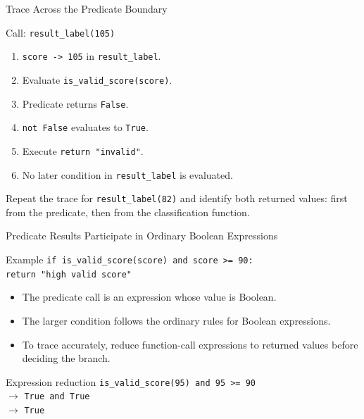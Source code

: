 \documentclass[aspectratio=169,10pt]{beamer}
\begin{document}
\begin{frame}{Trace Across the Predicate Boundary}
  \begin{block}{Call: \texttt{result\_label(105)}}
    \begin{enumerate}
      \item \texttt{score -> 105} in \texttt{result\_label}.
      \item Evaluate \texttt{is\_valid\_score(score)}.
      \item Predicate returns \texttt{False}.
      \item \texttt{not False} evaluates to \texttt{True}.
      \item Execute \texttt{return "invalid"}.
      \item No later condition in \texttt{result\_label} is evaluated.
    \end{enumerate}
  \end{block}

  \begin{activity}
    Repeat the trace for \texttt{result\_label(82)} and identify both returned values: first from the predicate, then from the classification function.
  \end{activity}
\end{frame}

\begin{frame}{Predicate Results Participate in Ordinary Boolean Expressions}
  \begin{block}{Example}
    \texttt{if is\_valid\_score(score) and score >= 90:}\\
    \hspace*{0.20in}\texttt{return "high valid score"}
  \end{block}

  \begin{itemize}
    \item The predicate call is an expression whose value is Boolean.
    \item The larger condition follows the ordinary rules for Boolean expressions.
    \item To trace accurately, reduce function-call expressions to returned values before deciding the branch.
  \end{itemize}

  \begin{block}{Expression reduction}
    \centering
    \texttt{is\_valid\_score(95) and 95 >= 90}\\
    $\longrightarrow$ \texttt{True and True}\\
    $\longrightarrow$ \texttt{True}
  \end{block}
\end{frame}
\end{document}
